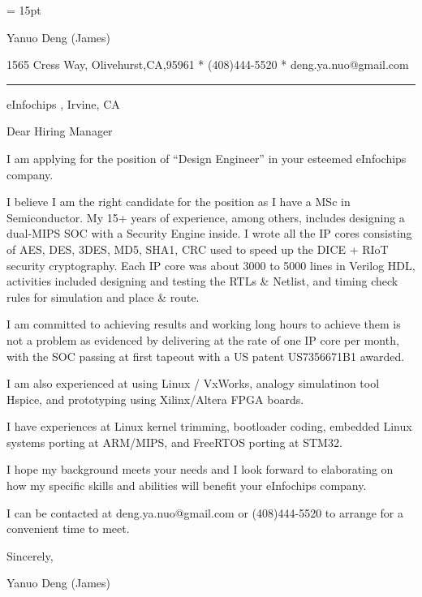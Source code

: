 

  \FFrg \baselineskip = 15pt

{
Yanuo Deng (James)
}

{ 
1565 Cress Way, Olivehurst,CA,95961
*
(408)444-5520
*
deng.ya.nuo@gmail.com
}

{ \smallbreak } 
{\par\noindent\hrule} 
{ \medbreak } { 
}

%
%

{ \bigbreak } 

eInfochips , Irvine, CA

{ 
Dear Hiring Manager
}

{ \bigbreak } 
I am applying for the position of ``Design Engineer'' in your esteemed eInfochips company.

{ \bigbreak } 
I believe I am the right candidate for the position as I have a MSc in Semiconductor.
My 15+ years of experience, among others, 
includes designing a dual-MIPS SOC with a Security Engine inside. 
I wrote all the IP cores consisting of AES, DES, 3DES, MD5, SHA1, CRC 
used to speed up the DICE + RIoT security cryptography.
Each IP core was about 3000 to 5000 lines in Verilog HDL, 
activities included designing and testing the RTLs \& Netlist,
and timing check rules for simulation and place \& route.

{ \bigbreak } 
I am committed to achieving results and working long hours 
to achieve them is not a problem as evidenced by 
delivering at the rate of one IP core per month,
with the SOC passing at first tapeout
with a US patent US7356671B1 awarded.

{ \bigbreak } 
I am also experienced at using Linux / VxWorks, 
analogy simulatinon tool Hspice, 
and prototyping using Xilinx/Altera FPGA boards.

{ \bigbreak } 
I have experiences at Linux kernel trimming, bootloader coding, embedded Linux systems porting at ARM/MIPS, and FreeRTOS porting at STM32.

{ \bigbreak } 
I hope my background meets your needs and I look
forward to elaborating on how my specific skills and abilities will benefit your eInfochips company.

{ \bigbreak } 
I can be contacted at deng.ya.nuo@gmail.com
or (408)444-5520 to arrange for a convenient time to meet.

{ \bigbreak } 




\vskip 60pt

{ \bigbreak } 
Sincerely,

Yanuo Deng (James)

\bye
